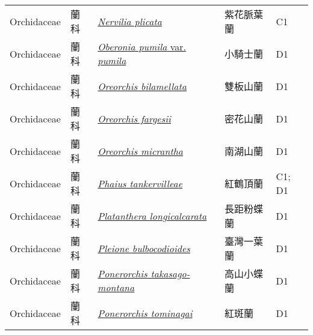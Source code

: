 {\begin{longtable}{p{2.5cm}p{2.5cm}p{4.5cm}p{2.5cm}p{3cm}}
    Orchidaceae & 蘭科 & \href{http://www.theplantlist.org/tpl1.1/search?q=Nervilia+plicata}{\textit{Nervilia plicata} } & 紫花脈葉蘭 & C1 \index{Nervilia@\textit{Nervilia}!plicata@\textit{plicata}}  \index{紫花脈葉蘭} \\
    Orchidaceae & 蘭科 & \href{http://www.theplantlist.org/tpl1.1/search?q=Oberonia+pumila+var.+pumila}{\textit{Oberonia pumila} var. \textit{pumila} } & 小騎士蘭 & D1 \index{Oberonia@\textit{Oberonia}!pumila@\textit{pumila}!var. pumila@var. \textit{pumila}}  \index{小騎士蘭} \\
    Orchidaceae & 蘭科 & \href{http://www.theplantlist.org/tpl1.1/search?q=Oreorchis+bilamellata}{\textit{Oreorchis bilamellata} } & 雙板山蘭 & D1 \index{Oreorchis@\textit{Oreorchis}!bilamellata@\textit{bilamellata}}  \index{雙板山蘭} \\
    Orchidaceae & 蘭科 & \href{http://www.theplantlist.org/tpl1.1/search?q=Oreorchis+fargesii}{\textit{Oreorchis fargesii} } & 密花山蘭 & D1 \index{Oreorchis@\textit{Oreorchis}!fargesii@\textit{fargesii}}  \index{密花山蘭} \\
    Orchidaceae & 蘭科 & \href{http://www.theplantlist.org/tpl1.1/search?q=Oreorchis+micrantha}{\textit{Oreorchis micrantha} } & 南湖山蘭 & D1 \index{Oreorchis@\textit{Oreorchis}!micrantha@\textit{micrantha}}  \index{南湖山蘭} \\
    Orchidaceae & 蘭科 & \href{http://www.theplantlist.org/tpl1.1/search?q=Phaius+tankervilleae}{\textit{Phaius tankervilleae} } & 紅鶴頂蘭 & C1; D1 \index{Phaius@\textit{Phaius}!tankervilleae@\textit{tankervilleae}}  \index{紅鶴頂蘭} \\
    Orchidaceae & 蘭科 & \href{http://www.theplantlist.org/tpl1.1/search?q=Platanthera+longicalcarata}{\textit{Platanthera longicalcarata} } & 長距粉蝶蘭 & D1 \index{Platanthera@\textit{Platanthera}!longicalcarata@\textit{longicalcarata}}  \index{長距粉蝶蘭} \\
    Orchidaceae & 蘭科 & \href{http://www.theplantlist.org/tpl1.1/search?q=Pleione+bulbocodioides}{\textit{Pleione bulbocodioides} } & 臺灣一葉蘭 & D1 \index{Pleione@\textit{Pleione}!bulbocodioides@\textit{bulbocodioides}}  \index{臺灣一葉蘭} \\
    Orchidaceae & 蘭科 & \href{http://www.theplantlist.org/tpl1.1/search?q=Ponerorchis+takasago-montana}{\textit{Ponerorchis takasago-montana} } & 高山小蝶蘭 & D1 \index{Ponerorchis@\textit{Ponerorchis}!takasago-montana@\textit{takasago-montana}}  \index{高山小蝶蘭} \\
    Orchidaceae & 蘭科 & \href{http://www.theplantlist.org/tpl1.1/search?q=Ponerorchis+tominagai}{\textit{Ponerorchis tominagai} } & 紅斑蘭 & D1 \index{Ponerorchis@\textit{Ponerorchis}!tominagai@\textit{tominagai}}  \index{紅斑蘭} \\

\end{longtable}}
